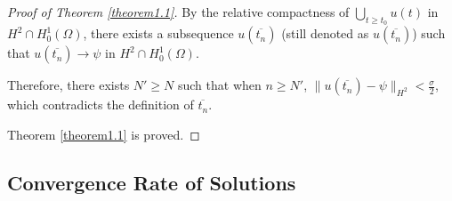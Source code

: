 \documentclass{article}
\numberwithin{equation}{section}
\begin{document}
\begin{proof}[Proof of Theorem \ref{theorem1.1}]
    By the relative compactness of $\bigcup_{t\ge t_0}u(t)$ in $H^2\cap H_0^1(\Omega)$, there exists a subsequence $u(\overline{t_n})$ (still denoted as $u(\overline{t_n})$) such that $u(\overline{t_n})\to \psi$ in $H^2\cap H_0^1(\Omega)$.

    Therefore, there exists $N'\ge N$ such that when $n\ge N'$, $\|u(\overline{t_n})-\psi\|_{H^2}<\frac{\sigma}{2}$, which contradicts the definition of $\overline{t_n}$.

    Theorem \ref{theorem1.1} is proved.
\end{proof}

\subsection{Convergence Rate of Solutions}
\end{document}
